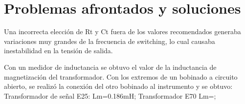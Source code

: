 \section{Problemas afrontados y soluciones}

Una incorrecta elección de Rt y Ct fuera de los valores recomendados generaba variaciones muy grandes de la frecuencia de switching, 
lo cual causaba inestabilidad en la tensión de salida. 

Con un medidor de inductancia se obtuvo el valor de la inductancia de magnetización del transformador.
Con los extremos de un bobinado a circuito abierto, se realizó la conexión del otro bobinado al instrumento y se obtuvo:
Transformador de señal E25:
Lm=0.186mH; 
Transformador E70
Lm=;    

